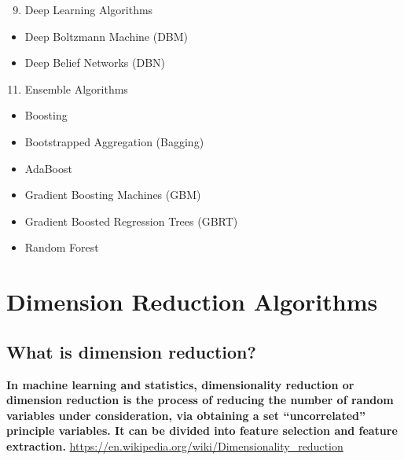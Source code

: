 \documentclass[letterpaper,11pt,english]{sphinxmanual}
\begin{document}
\begin{enumerate}
\setcounter{enumi}{8}
\item {} 
Deep Learning Algorithms

\end{enumerate}
\begin{itemize}
\item {} 
Deep Boltzmann Machine (DBM)

\item {} 
Deep Belief Networks (DBN)

\end{itemize}
\begin{enumerate}
\setcounter{enumi}{10}
\item {} 
Ensemble Algorithms

\end{enumerate}
\begin{itemize}
\item {} 
Boosting

\item {} 
Bootstrapped Aggregation (Bagging)

\item {} 
AdaBoost

\item {} 
Gradient Boosting Machines (GBM)

\item {} 
Gradient Boosted Regression Trees (GBRT)

\item {} 
Random Forest

\end{itemize}
\label{dim:dim}

\chapter{Dimension Reduction Algorithms}
\label{dim:index-0}\label{dim::doc}\label{dim:dimension-reduction-algorithms}

\section{What is dimension reduction?}
\label{dim:what-is-dimension-reduction}
\textbf{In machine learning and statistics, dimensionality reduction or dimension reduction is the process of reducing the number of random variables under consideration,
via obtaining a set ``uncorrelated'' principle variables. It can be divided into feature selection and feature extraction.} \href{https://en.wikipedia.org/wiki/Dimensionality\_reduction}{https://en.wikipedia.org/wiki/Dimensionality\_reduction}
\end{document}
